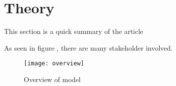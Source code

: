 \section{Theory}
This section is a quick summary of the article \cite{Santos2017stepwise}

As seen in figure , there are many stakeholder involved.

\begin{figure}[h]
	\centering
	\texttt{[image: overview]}
	\caption{Overview of model}
	\label{fig:overview}
\end{figure}